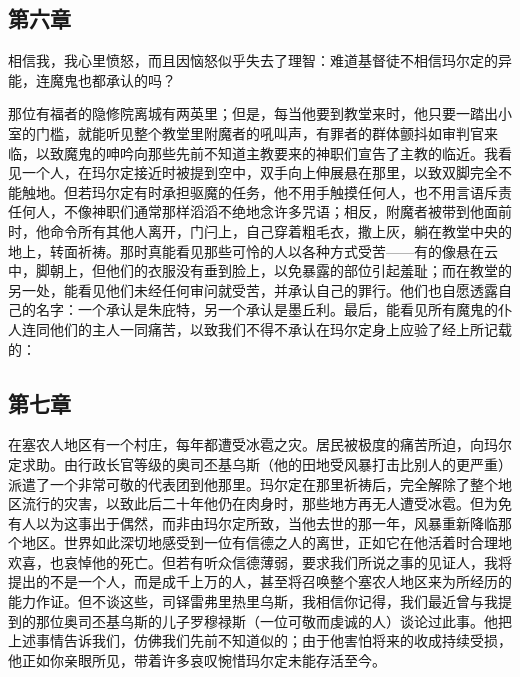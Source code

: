
\subsection{第六章}

相信我，我心里愤怒，而且因恼怒似乎失去了理智：难道基督徒不相信玛尔定的异能，连魔鬼也都承认的吗？\par

那位有福者的隐修院离城有两英里；但是，每当他要到教堂来时，他只要一踏出小室的门槛，就能听见整个教堂里附魔者的吼叫声，有罪者的群体颤抖如审判官来临，以致魔鬼的呻吟向那些先前不知道主教要来的神职们宣告了主教的临近。我看见一个人，在玛尔定接近时被提到空中，双手向上伸展悬在那里，以致双脚完全不能触地。但若玛尔定有时承担驱魔的任务，他不用手触摸任何人，也不用言语斥责任何人，不像神职们通常那样滔滔不绝地念许多咒语；相反，附魔者被带到他面前时，他命令所有其他人离开，门闩上，自己穿着粗毛衣，撒上灰，躺在教堂中央的地上，转面祈祷。那时真能看见那些可怜的人以各种方式受苦——有的像悬在云中，脚朝上，但他们的衣服没有垂到脸上，以免暴露的部位引起羞耻；而在教堂的另一处，能看见他们未经任何审问就受苦，并承认自己的罪行。他们也自愿透露自己的名字：一个承认是朱庇特，另一个承认是墨丘利。最后，能看见所有魔鬼的仆人连同他们的主人一同痛苦，以致我们不得不承认在玛尔定身上应验了经上所记载的：\par


\subsection{第七章}

在塞农人地区有一个村庄，每年都遭受冰雹之灾。居民被极度的痛苦所迫，向玛尔定求助。由行政长官等级的奥司丕基乌斯（他的田地受风暴打击比别人的更严重）派遣了一个非常可敬的代表团到他那里。玛尔定在那里祈祷后，完全解除了整个地区流行的灾害，以致此后二十年他仍在肉身时，那些地方再无人遭受冰雹。但为免有人以为这事出于偶然，而非由玛尔定所致，当他去世的那一年，风暴重新降临那个地区。世界如此深切地感受到一位有信德之人的离世，正如它在他活着时合理地欢喜，也哀悼他的死亡。但若有听众信德薄弱，要求我们所说之事的见证人，我将提出的不是一个人，而是成千上万的人，甚至将召唤整个塞农人地区来为所经历的能力作证。但不谈这些，司铎雷弗里热里乌斯，我相信你记得，我们最近曾与我提到的那位奥司丕基乌斯的儿子罗穆禄斯（一位可敬而虔诚的人）谈论过此事。他把上述事情告诉我们，仿佛我们先前不知道似的；由于他害怕将来的收成持续受损，他正如你亲眼所见，带着许多哀叹惋惜玛尔定未能存活至今。\par

